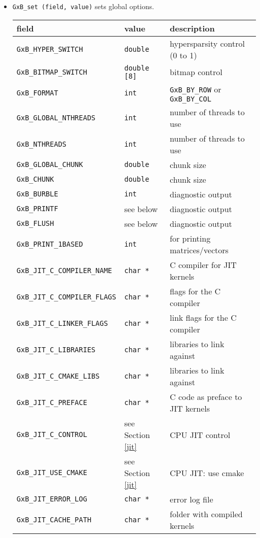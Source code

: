 \documentclass[12pt]{article}
\begin{document}
\begin{itemize}

\item \verb'GxB_set (field, value)' sets global options.

{\footnotesize
\begin{tabular}{lll}
field                       & value         & description \\
\hline
\verb'GxB_HYPER_SWITCH'     & \verb'double' & hypersparsity control (0 to 1) \\
\verb'GxB_BITMAP_SWITCH'    & \verb'double [8]' & bitmap control \\
\verb'GxB_FORMAT'           & \verb'int'    & \verb'GxB_BY_ROW'
                                              or \verb'GxB_BY_COL' \\
\verb'GxB_GLOBAL_NTHREADS'  & \verb'int'    & number of threads to use \\
\verb'GxB_NTHREADS'         & \verb'int'    & number of threads to use \\
\verb'GxB_GLOBAL_CHUNK'     & \verb'double' & chunk size \\
\verb'GxB_CHUNK'            & \verb'double' & chunk size \\
\verb'GxB_BURBLE'           & \verb'int'    & diagnostic output \\
\verb'GxB_PRINTF'           & see below     & diagnostic output \\
\verb'GxB_FLUSH'            & see below     & diagnostic output \\
\verb'GxB_PRINT_1BASED'     & \verb'int'    & for printing matrices/vectors \\
\hline
\verb'GxB_JIT_C_COMPILER_NAME' & \verb'char *' & C compiler for JIT kernels \\
\verb'GxB_JIT_C_COMPILER_FLAGS'& \verb'char *' & flags for the C compiler \\
\verb'GxB_JIT_C_LINKER_FLAGS' & \verb'char *' & link flags for the C compiler \\
\verb'GxB_JIT_C_LIBRARIES'    & \verb'char *' & libraries to link against \\
\verb'GxB_JIT_C_CMAKE_LIBS'   & \verb'char *' & libraries to link against \\
\verb'GxB_JIT_C_PREFACE'      & \verb'char *' & C code as preface to JIT kernels \\
\verb'GxB_JIT_C_CONTROL'      & see Section \ref{jit} & CPU JIT control \\
\verb'GxB_JIT_USE_CMAKE'      & see Section \ref{jit} & CPU JIT: use cmake \\
\verb'GxB_JIT_ERROR_LOG'      & \verb'char *' & error log file \\
\verb'GxB_JIT_CACHE_PATH'     & \verb'char *' & folder with compiled kernels \\
\hline
\end{tabular}
}


\end{itemize}
\end{document}
